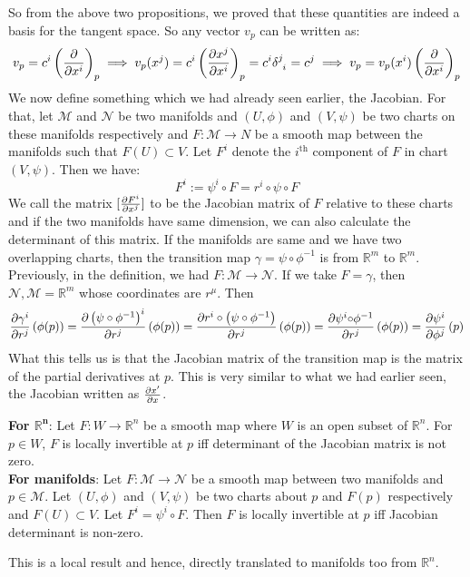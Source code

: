 So from the above two propositions, we proved that these quantities are indeed a basis for the tangent space. So any vector $v_p$ can be written as: $$v_p = c^i \brac{\pdv{x^i}}_p \implies v_p(x^j) = c^i \brac{\pdv{x^j}{x^i}}_p = c^i \tensor{\delta}{^j _i} = c^j \implies v_p = v_p(x^i) \brac{\pdv{x^i}}_p$$
We now define something which we had already seen earlier, the Jacobian. For that, let $\mathcal{M}$ and $\mathcal{N}$ be two manifolds and $(U,\phi)$ and $(V,\psi)$ be two charts on these manifolds respectively and $F: \mathcal{M}\rightarrow N$ be a smooth map between the manifolds such that $F(U) \subset V$. Let $F^i$ denote the $i^{\text{th}}$ component of $F$ in chart $(V,\psi)$. Then we have:
$$F^i := \psi^i \circ F = r^i \circ \psi \circ F$$
We call the matrix $[\pdv{F^i}{x^j}]$ to be the Jacobian matrix of $F$ relative to these charts and if the two manifolds have same dimension, we can also calculate the determinant of this matrix. If the manifolds are same and we have two overlapping charts, then the transition map $\gamma = \psi \circ \phi^{-1}$ is from $\mathbb{R}^m$ to $\mathbb{R}^m$. Previously, in the definition, we had $F:\mathcal{M}\rightarrow \mathcal{N}$. If we take $F= \gamma$, then $\mathcal{N},\mathcal{M} = \mathbb{R}^m$ whose coordinates are $r^\mu$. Then
$$\pdv{\gamma^i}{r^j}\left( \phi(p) \right) = \pdv{\left( \psi \circ \phi^{-1} \right)^i}{r^j}\left( \phi(p) \right) =\pdv{r^i \circ \left( \psi \circ \phi^{-1} \right)}{r^j}\left( \phi(p) \right) = \pdv{ \psi^i { \circ \phi^{-1}}}{r^j}\left( \phi(p) \right) = \pdv{\psi^i}{\phi^j}\left( p \right)$$
What this tells us is that the Jacobian matrix of the transition map is the matrix of the partial derivatives at $p$. This is very similar to what we had earlier seen, the Jacobian written as $\pdv{x'}{x}$. 

\begin{theorem}
  \textbf{For $\mathbf{\mathbb{R}^n}$}: Let $F: W\rightarrow \mathbb{R}^n$ be a smooth map where $W$ is an open subset of $\mathbb{R}^n$. For $p\in W$, $F$ is locally invertible at $p$ iff determinant of the Jacobian matrix is not zero. \\[0.2cm]
  \textbf{For manifolds}: Let $F:\mathcal{M}\rightarrow \mathcal{N}$ be a smooth map between two manifolds and $p\in \mathcal{M}$. Let $(U,\phi)$ and $(V,\psi)$ be two charts about $p$ and $F(p)$ respectively and $F(U)\subset V$. Let $F^i = \psi^i \circ F$. Then $F$ is locally invertible at $p$ iff Jacobian determinant is non-zero.
\end{theorem}
This is a local result and hence, directly translated to manifolds too from $\mathbb{R}^n$.
